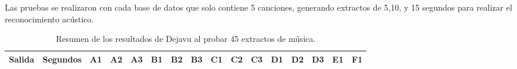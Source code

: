 \begin{sidewaystable}
\centering
\caption{Resumen de los resultados de Dejavu al probar 45 extractos de música.}{Las pruebas se realizaron con cada base de datos que solo contiene 5 canciones, generando extractos de 5,10, y 15 segundos para realizar el reconocimiento acústico.}
\label{tab:Resumen5Canciones}
\begin{tabular}{@{}ccc|rrrrrrrrrrrrrr@{}}
\toprule
\midrule
\multicolumn{2}{c}{Salida}                                            &  Segundos  & \multicolumn{1}{c}{A1} & \multicolumn{1}{c}{A2} & \multicolumn{1}{c}{A3} & \multicolumn{1}{c}{B1} & \multicolumn{1}{c}{B2} & \multicolumn{1}{c}{B3} & \multicolumn{1}{c}{C1} & \multicolumn{1}{c}{C2} & \multicolumn{1}{c}{C3} & \multicolumn{1}{c}{D1} & \multicolumn{1}{c}{D2} & \multicolumn{1}{c}{D3} & \multicolumn{1}{c}{E1} & \multicolumn{1}{c}{F1} \\ \midrule



\end{tabular}
\end{sidewaystable}
